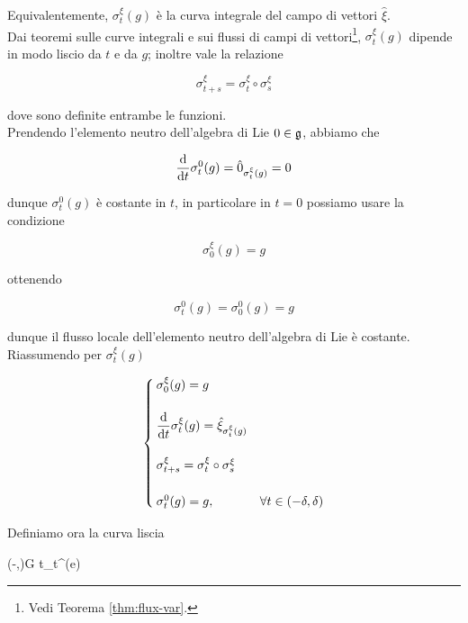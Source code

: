 Equivalentemente, $ \sigma_{t}^{\xi}(g) $ è la curva integrale del campo di vettori $ \hat{\xi} $.\\
Dai teoremi sulle curve integrali e sui flussi di campi di vettori\footnote{%
	Vedi Teorema \ref{thm:flux-var}.%
}, $ \sigma_{t}^{\xi}(g) $ dipende in modo liscio da $ t $ e da $ g $; inoltre vale la relazione

\begin{equation}
	\sigma_{t+s}^{\xi} = \sigma_{t}^{\xi} \circ \sigma_{s}^{\xi}
\end{equation}

dove sono definite entrambe le funzioni.\\
Prendendo l'elemento neutro dell'algebra di Lie $ 0 \in \mathfrak{g} $, abbiamo che

\begin{equation}
	\dv{t} \sigma_{t}^{0}(g) = \hat{0}_{\sigma_{t}^{\xi}(g)} = 0
\end{equation}

dunque $ \sigma_{t}^{0}(g) $ è costante in $ t $, in particolare in $ t=0 $ possiamo usare la condizione

\begin{equation}
	\sigma_{0}^{\xi}(g) = g
\end{equation}

ottenendo

\begin{equation}
	\sigma_{t}^{0}(g) = \sigma_{0}^{0}(g) = g
\end{equation}

dunque il flusso locale dell'elemento neutro dell'algebra di Lie è costante.\\
Riassumendo per $ \sigma_{t}^{\xi}(g) $

\begin{equation}
	\begin{cases}
		\sigma_{0}^{\xi}(g) = g \\\\
		\ddv{t} \sigma_{t}^{\xi}(g) = \hat{\xi}_{\sigma_{t}^{\xi}(g)} \\\\
		\sigma_{t+s}^{\xi} = \sigma_{t}^{\xi} \circ \sigma_{s}^{\xi} \\\\
		\sigma_{t}^{0}(g) = g, & \forall t \in (-\delta,\delta)
	\end{cases}
\end{equation}

Definiamo ora la curva liscia

\map{\gamma^{\xi}}
	{(-\delta,\delta)}{G}
	{t}{\sigma_{t}^{\xi}(e)}
	
